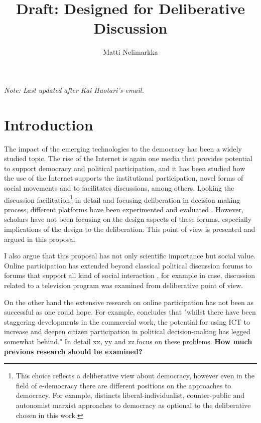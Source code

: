 \documentclass[journal,a4paper]{IEEEtran}
\author{Matti Nelimarkka}
\title{Draft: Designed for Deliberative Discussion}
\begin{document}
\maketitle

\setlength{\parindent}{0pt}
\setlength{\parskip}{1ex}

\textit{Note: Last updated after Kai Huotari's email.}

\section{Introduction}

The impact of the emerging technologies to the democracy has been a widely studied topic. The rise of the Internet is again one media that provides potential to support democracy and political participation, and it has been studied how the use of the Internet supports the institutional participation, novel forms of social movements and to facilitates discussions, among others. Looking the discussion facilitation\footnote{This choice reflects a deliberative view about democracy, however even in the field of e-democracy there are different positions on the approaches to democracy. For example,  distincts liberal-individualist, counter-public and autonomist marxist approaches to democracy as optional to the deliberative chosen in this work.} in detail and focusing deliberation in decision making process, different platforms have been experimented  and evaluated . However, scholars have not been focusing on the design aspects of these forums, especially implications of the design to the deliberation. This point of view is presented and argued in this proposal.

I also argue that this proposal has not only scientific importance but social value. Online participation has extended beyond classical political discussion forums to forums that support all kind of social interaction \cite{graham12}, for example in  case, discussion related to a television program was examined from deliberative point of view.

On the other hand the extensive research on online participation has not been as successful as one could hope. For example,  concludes that "whilst there have been staggering developments in the commercial work, the potential for using ICT to increase and deepen citizen participation in political decision-making has legged somewhat behind." In detail xx, yy and zz focus on these problems. \textbf{How much previous research should be examined?}
\end{document}
